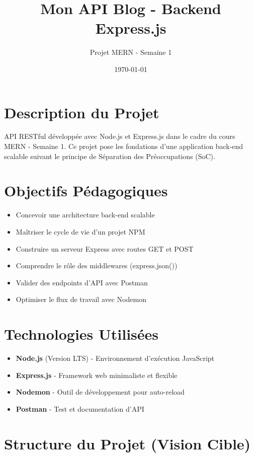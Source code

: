 \documentclass[12pt,a4paper]{article}
\title{\Huge\textbf{Mon API Blog - Backend Express.js}}
\author{Projet MERN - Semaine 1}
\date{\today}
\begin{document}
\maketitle
\tableofcontents
\newpage

\section{Description du Projet}

API RESTful développée avec Node.js et Express.js dans le cadre du cours MERN - Semaine 1. Ce projet pose les fondations d'une application back-end scalable suivant le principe de Séparation des Préoccupations (SoC).

\section{Objectifs Pédagogiques}

\begin{itemize}
    \item Concevoir une architecture back-end scalable
    \item Maîtriser le cycle de vie d'un projet NPM
    \item Construire un serveur Express avec routes GET et POST
    \item Comprendre le rôle des middlewares (express.json())
    \item Valider des endpoints d'API avec Postman
    \item Optimiser le flux de travail avec Nodemon
\end{itemize}

\section{Technologies Utilisées}

\begin{itemize}
    \item \textbf{Node.js} (Version LTS) - Environnement d'exécution JavaScript
    \item \textbf{Express.js} - Framework web minimaliste et flexible
    \item \textbf{Nodemon} - Outil de développement pour auto-reload
    \item \textbf{Postman} - Test et documentation d'API
\end{itemize}

\section{Structure du Projet (Vision Cible)}
\end{document}
